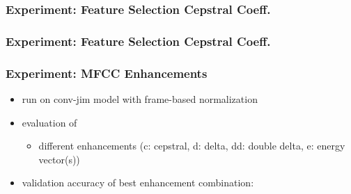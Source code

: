 \begin{frame}
  \frametitle{Experiment: Feature Selection Cepstral Coeff.}
  \begin{figure}[!ht]
    \centering
  \end{figure}
\end{frame}

\begin{frame}
  \frametitle{Experiment: Feature Selection Cepstral Coeff.}
  
\end{frame}

\begin{frame}
  \frametitle{Experiment: MFCC Enhancements}
  \begin{itemize}
    \item run on conv-jim model with frame-based normalization
    \item evaluation of
    \begin{itemize}
     \item different enhancements (c: cepstral, d: delta, dd: double delta, e: energy vector(s))
    \end{itemize}
    \item validation accuracy of best enhancement combination:
  \end{itemize}
  \vspace{-0.5cm}
  \begin{figure}[!ht]
    \centering
  \end{figure}
\end{frame}

